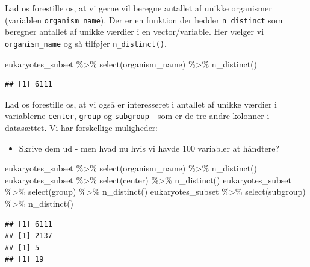 \documentclass[
]{book}
\newenvironment{Shaded}{\begin{snugshade}}{\end{snugshade}}
\newcommand{\FunctionTok}[1]{\textcolor[rgb]{0.00,0.00,0.00}{#1}}
\newcommand{\NormalTok}[1]{#1}
\newcommand{\SpecialCharTok}[1]{\textcolor[rgb]{0.00,0.00,0.00}{#1}}
\providecommand{\tightlist}{%
  \setlength{\itemsep}{0pt}\setlength{\parskip}{0pt}}
\begin{document}
Lad os forestille os, at vi gerne vil beregne antallet af unikke organismer (variablen \texttt{organism\_name}). Der er en funktion der hedder \texttt{n\_distinct} som beregner antallet af unikke værdier i en vector/variable. Her vælger vi \texttt{organism\_name} og så tilføjer \texttt{n\_distinct()}.

\begin{Shaded}
\begin{Highlighting}[]
\NormalTok{eukaryotes\_subset }\SpecialCharTok{\%\textgreater{}\%} 
  \FunctionTok{select}\NormalTok{(organism\_name) }\SpecialCharTok{\%\textgreater{}\%} 
  \FunctionTok{n\_distinct}\NormalTok{()}
\end{Highlighting}
\end{Shaded}

\begin{verbatim}
## [1] 6111
\end{verbatim}

Lad os forestille os, at vi også er interesseret i antallet af unikke værdier i variablerne \texttt{center}, \texttt{group} og \texttt{subgroup} - som er de tre andre kolonner i datasættet. Vi har forskellige muligheder:

\begin{itemize}
\tightlist
\item
  Skrive dem ud - men hvad nu hvis vi havde 100 variabler at håndtere?
\end{itemize}

\begin{Shaded}
\begin{Highlighting}[]
\NormalTok{eukaryotes\_subset }\SpecialCharTok{\%\textgreater{}\%} \FunctionTok{select}\NormalTok{(organism\_name) }\SpecialCharTok{\%\textgreater{}\%} \FunctionTok{n\_distinct}\NormalTok{()}
\NormalTok{eukaryotes\_subset }\SpecialCharTok{\%\textgreater{}\%} \FunctionTok{select}\NormalTok{(center) }\SpecialCharTok{\%\textgreater{}\%} \FunctionTok{n\_distinct}\NormalTok{()}
\NormalTok{eukaryotes\_subset }\SpecialCharTok{\%\textgreater{}\%} \FunctionTok{select}\NormalTok{(group) }\SpecialCharTok{\%\textgreater{}\%} \FunctionTok{n\_distinct}\NormalTok{()}
\NormalTok{eukaryotes\_subset }\SpecialCharTok{\%\textgreater{}\%} \FunctionTok{select}\NormalTok{(subgroup) }\SpecialCharTok{\%\textgreater{}\%} \FunctionTok{n\_distinct}\NormalTok{()}
\end{Highlighting}
\end{Shaded}

\begin{verbatim}
## [1] 6111
## [1] 2137
## [1] 5
## [1] 19
\end{verbatim}
\end{document}

